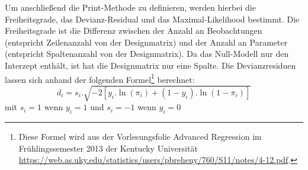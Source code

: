 \documentclass[12pt,]{article}
\newenvironment{Shaded}{\begin{snugshade}}{\end{snugshade}}
\newcommand{\KeywordTok}[1]{\textcolor[rgb]{0.13,0.29,0.53}{\textbf{#1}}}
\newcommand{\DecValTok}[1]{\textcolor[rgb]{0.00,0.00,0.81}{#1}}
\newcommand{\StringTok}[1]{\textcolor[rgb]{0.31,0.60,0.02}{#1}}
\newcommand{\CommentTok}[1]{\textcolor[rgb]{0.56,0.35,0.01}{\textit{#1}}}
\newcommand{\OperatorTok}[1]{\textcolor[rgb]{0.81,0.36,0.00}{\textbf{#1}}}
\newcommand{\NormalTok}[1]{#1}
\let\rmarkdownfootnote\footnote%
\def\footnote{\protect\rmarkdownfootnote}
\begin{document}
\begin{Shaded}
\end{Shaded}

Um anschließend die Print-Methode zu definieren, werden hierbei die
Freiheitsgrade, das Devianz-Residual und das Maximal-Likelihood
bestimmt. Die Freiheitsgrade ist die Differenz zwischen der Anzahl an
Beobachtungen (entspricht Zeilenanzahl von der Designmatrix) und der
Anzahl an Parameter (entspricht Spaltenanzahl von der Designmatrix). Da
das Null-Modell nur den Interzept enthält, ist hat die Designmatrix nur
eine Spalte. Die Devianzresiduen lassen sich anhand der folgenden
Formel\footnote{Diese Formel wird aus der Vorlesungsfolie Advanced
  Regression im Frühlingssemester 2013 der Kentucky Universität
  \url{https://web.as.uky.edu/statistics/users/pbreheny/760/S11/notes/4-12.pdf}.}
berechnet: \[
d_i = s_i.\sqrt{-2[y_i.\ln(\pi_i) + (1 - y_i).\ln(1 - \pi_i)]}
\] mit \(s_i = 1\) wenn \(y_i = 1\) und \(s_i = -1\) wenn \(y_i = 0\)
\end{document}
